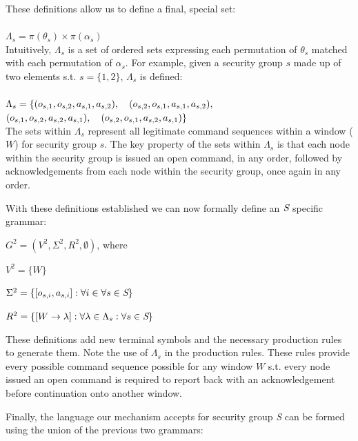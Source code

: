 \documentclass[oneside,12pt]{memoir}
\newcommand{\tab}{\hspace*{2em}}
\begin{document}
These definitions allow us to define a final, special set:\\
\\
$\Lambda_s = \pi(\theta_s) \times \pi(\alpha_s)$\\

Intuitively, $\Lambda_s$ is a set of ordered sets expressing each permutation of $\theta_s$ matched with each permutation of $\alpha_s$. For example, given a security group $s$ made up of two elements s.t. $s = \{1, 2\}$, $\Lambda_s$ is defined:\\
\\
$\Lambda_s = \{ (o_{s,1}, o_{s,2}, a_{s,1}, a_{s,2}),\hspace*{1.0em} (o_{s,2}, o_{s,1}, a_{s,1}, a_{s,2}),$\\
\hspace*{3.0em}$ (o_{s,1}, o_{s,2}, a_{s,2}, a_{s,1}),\hspace*{1.0em} (o_{s,2}, o_{s,1}, a_{s,2}, a_{s,1})\}$\\

The sets within $\Lambda_s$ represent all legitimate command sequences within a window ($W$) for security group $s$. The key property of the sets within $\Lambda_s$ is that each node within the security group is issued an open command, in any order, followed by acknowledgements from each node within the security group, once again in any order.

With these definitions established we can now formally define an $\emph{S}$ specific grammar:

\tab $G^2 = (V^2, \Sigma^2, R^2, \emptyset)$, where

\tab $V^2 =\{W\}$

\tab $\Sigma ^2 = \{[o_{s,i}, a_{s,i}]:\forall i \in \forall s\in \emph{S}\}$

\tab $R^2 = \{[W\rightarrow \lambda  ] :\forall \lambda \in \Lambda_s :\forall s\in \emph{S}\}$


These definitions add new terminal symbols and the necessary production rules to generate them. Note the use of $\Lambda_s$ in the production rules. These rules provide every possible command sequence possible for any window $W$ s.t. every node issued an open command is required to report back with an acknowledgement before continuation onto another window.

Finally, the language our mechanism accepts for security group \emph{S} can be formed using the union of the previous two grammars:\\
\end{document}
